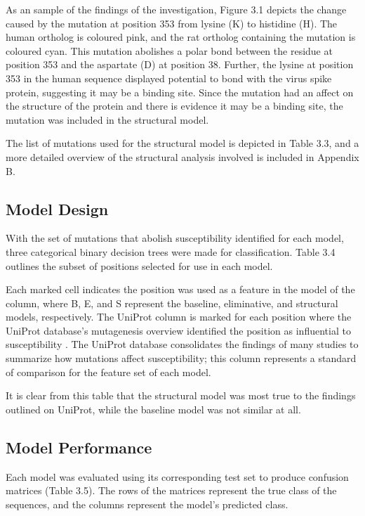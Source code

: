 As an sample of the findings of the investigation, Figure 3.1 depicts the change caused by the mutation at position 353 from lysine (K) to histidine (H). The human ortholog is coloured pink, and the rat ortholog containing the mutation is coloured cyan. This mutation abolishes a polar bond between the residue at position 353 and the aspartate (D) at position 38. Further, the lysine at position 353 in the human sequence displayed potential to bond with the virus spike protein, suggesting it may be a binding site. Since the mutation had an affect on the structure of the protein and there is evidence it may be a binding site, the mutation was included in the structural model. 



The list of mutations used for the structural model is depicted in Table 3.3, and a more detailed overview of the structural analysis involved is included in Appendix B.

\subsection{Model Design}

With the set of mutations that abolish susceptibility identified for each model, three categorical binary decision trees were made for classification. Table 3.4 outlines the subset of positions selected for use in each model.



Each marked cell indicates the position was used as a feature in the model of the column, where B, E, and S represent the baseline, eliminative, and structural models, respectively. The UniProt column is marked for each position where the UniProt database's mutagenesis overview identified the position as influential to susceptibility \cite{UniProt}. The UniProt database consolidates the findings of many studies to summarize how mutations affect susceptibility; this column represents a standard of comparison for the feature set of each model.

It is clear from this table that the structural model was most true to the findings outlined on UniProt, while the baseline model was not similar at all.

\subsection{Model Performance}

Each model was evaluated using its corresponding test set to produce confusion matrices (Table 3.5). The rows of the matrices represent the true class of the sequences, and the columns represent the model's predicted class.

